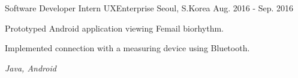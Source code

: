 \begin{cventries}
  \cventry
    {Software Developer Intern} %
    {UXEnterprise} %
    {Seoul, S.Korea} %
    {Aug. 2016 - Sep. 2016} %
    {
      \begin{cvitems} %
        \item {Prototyped Android application viewing Femail biorhythm.}
        \item {Implemented connection with a measuring device using Bluetooth.}
        \item \textit{Java, Android}
      \end{cvitems}
    }

\end{cventries}
